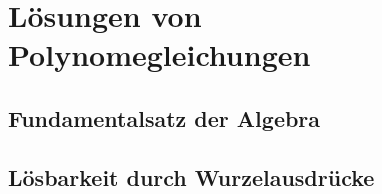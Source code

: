 %
%
%
\section{Lösungen von Polynomegleichungen
\label{buch:potenzen:section:loesungen}}

%
%
\subsection{Fundamentalsatz der Algebra}

%
%
\subsection{Lösbarkeit durch Wurzelausdrücke}
